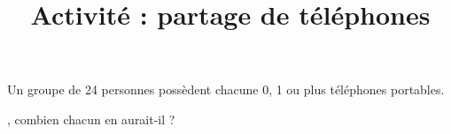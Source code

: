 \documentclass{beamer}
\title{Activité : partage de téléphones}
\author{}
\date{}
\begin{document}
\begin{frame}
	\maketitle
\end{frame}

\begin{frame}
	Un groupe de 24 personnes possèdent chacune 0, 1 ou plus téléphones portables. \vspace{1em}

	, combien chacun en aurait-il ?
\end{frame}
\end{document}

